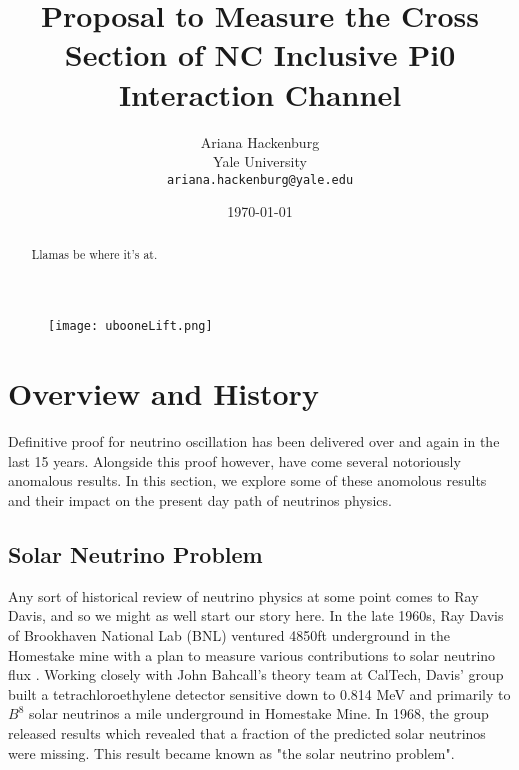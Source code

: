 \documentclass[12pt]{article}
\begin{document}
\title{Proposal to Measure the Cross Section of NC Inclusive Pi0 Interaction Channel }
\author{Ariana Hackenburg  \\Yale University \\ 
			\texttt{ariana.hackenburg@yale.edu}}
\date{\today}
\maketitle


\renewcommand{\abstractname}{Abstract}
\begin{abstract}
Llamas be where it's at.
\end{abstract}

\begin{figure}[h!]
\centering
\texttt{[image: ubooneLift.png]}
\end{figure}

\clearpage

\tableofcontents
\listoffigures
\listoftables
\setcounter{tocdepth}{3} 

\clearpage

\section{Overview and History}

Definitive proof for neutrino oscillation has been delivered over and again in the last 15 years. Alongside this proof however, have come several notoriously anomalous results. In this section, we explore some of these anomolous results and their impact on the present day path of neutrinos physics. 
\subsection{Solar Neutrino Problem}
Any sort of historical review of neutrino physics at some point comes to Ray Davis, and so we might as well start our story here.  In the late 1960s, Ray Davis of Brookhaven National Lab (BNL) ventured 4850ft underground in the Homestake mine with a plan to measure various contributions to solar neutrino flux \cite{ray0}. Working closely with John Bahcall's theory team at CalTech, Davis' group built a tetrachloroethylene detector sensitive down to 0.814 MeV and primarily to $B^8$ solar neutrinos\cite{ray0} a mile underground in Homestake Mine. In 1968, the group released results which revealed that a fraction of the predicted solar neutrinos were missing. This result became known as "the solar neutrino problem".
\end{document}
